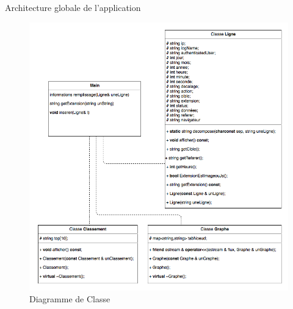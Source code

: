 \documentclass[11pt]{article}
\begin{document}
\begin{section}{Architecture globale de l'application}
\begin{figure}
\begin{center}
\includegraphics[scale=0.6]{diag.png} 
\end{center}
\caption{Diagramme de Classe}
\label{Diagramme de Classe}
\end{figure}
\end{section}
\end{document}
